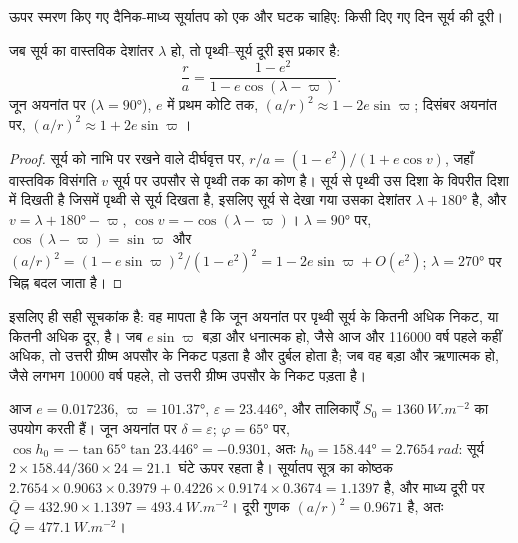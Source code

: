 ऊपर स्मरण किए गए दैनिक-माध्य सूर्यातप को एक और घटक चाहिए: किसी दिए गए दिन सूर्य की
दूरी।

\begin{proposition}[दूरी और सूर्य का देशांतर]\label{prop:b2:orbital-forcing:distance}
जब सूर्य का वास्तविक देशांतर $\lambda$ हो, तो पृथ्वी--सूर्य दूरी इस प्रकार है:
\[
  \frac{r}{a} = \frac{1 - e^2}{1 - e\cos(\lambda - \varpi)} .
\]
जून अयनांत पर ($\lambda = \ang{90}$), $e$ में प्रथम कोटि तक,
$(a/r)^2 \approx 1 - 2e\sin\varpi$; दिसंबर अयनांत पर, $(a/r)^2 \approx 1 + 2e\sin\varpi$।
\end{proposition}

\begin{proof}
सूर्य को नाभि पर रखने वाले दीर्घवृत्त पर, $r/a = (1 - e^2)/(1 + e\cos v)$, जहाँ वास्तविक विसंगति $v$
सूर्य पर उपसौर से पृथ्वी तक का कोण है। सूर्य से पृथ्वी उस दिशा के विपरीत दिशा में
दिखती है जिसमें पृथ्वी से सूर्य दिखता है, इसलिए सूर्य से देखा गया उसका देशांतर
$\lambda + \ang{180}$ है, और $v = \lambda + \ang{180} - \varpi$, $\cos v = -\cos(\lambda - \varpi)$।
$\lambda = \ang{90}$ पर, $\cos(\lambda - \varpi) = \sin\varpi$ और $(a/r)^2 = (1 -
e\sin\varpi)^2/(1 - e^2)^2 = 1 - 2e\sin\varpi + O(e^2)$; $\lambda = \ang{270}$ पर चिह्न बदल जाता है।
\end{proof}

इसलिए  ही सही सूचकांक है: वह मापता है कि जून अयनांत पर पृथ्वी सूर्य के कितनी अधिक निकट,
या कितनी अधिक दूर, है। जब $e\sin\varpi$ बड़ा और धनात्मक हो, जैसे आज और
\num{116000} वर्ष पहले कहीं अधिक, तो उत्तरी ग्रीष्म अपसौर के निकट पड़ता है और दुर्बल होता है; जब वह
बड़ा और ऋणात्मक हो, जैसे लगभग \num{10000} वर्ष पहले, तो उत्तरी ग्रीष्म उपसौर के निकट पड़ता है।

\begin{example}[\ang{65} उ पर जून का सूर्य, आज]\label{ex:b2:orbital-forcing:today}
आज $e = 0.017236$, $\varpi = \ang{101.37}$, $\varepsilon = \ang{23.446}$, और तालिकाएँ
$S_0 = \qty{1360}{W.m^{-2}}$ का उपयोग करती हैं। जून अयनांत पर $\delta = \varepsilon$; $\varphi =
\ang{65}$ पर, $\cos h_0 = -\tan\ang{65}\tan\ang{23.446} = -0.9301$, अतः $h_0 = \ang{158.44} =
\qty{2.7654}{rad}$: सूर्य $2 \times 158.44/360 \times 24 = 21.1$~घंटे ऊपर रहता है।
सूर्यातप सूत्र का कोष्ठक $2.7654 \times 0.9063 \times 0.3979 + 0.4226 \times 0.9174 \times 0.3674 =
1.1397$ है, और माध्य दूरी पर $\bar Q = 432.90 \times 1.1397 = \qty{493.4}{W.m^{-2}}$। दूरी
गुणक $(a/r)^2 = 0.9671$ है, अतः $\bar Q = \qty{477.1}{W.m^{-2}}$।
\end{example}

